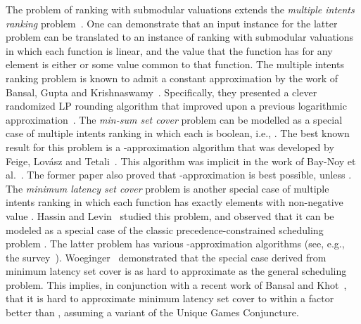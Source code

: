 \documentclass[11pt]{article}
\theoremstyle{plain}
\theoremstyle{definition}
\begin{document}
The problem of ranking with submodular valuations extends the
\emph{multiple intents ranking} problem~\cite{AzarGY09}. One can
demonstrate that an input instance for the latter problem can be
translated to an instance of ranking with submodular valuations in
which each function  is linear, and the value that the
function has for any element is either  or some value  common to that function. The multiple intents ranking
problem is known to admit a constant approximation by the work of
Bansal, Gupta and Krishnaswamy~\cite{BansalGK10}. Specifically,
they presented a clever randomized LP rounding algorithm that
improved upon a previous logarithmic
approximation~\cite{AzarGY09}. The \emph{min-sum set cover}
problem can be modelled as a special case of multiple intents
ranking in which each  is boolean, i.e., . The best known result for this problem is a
-approximation algorithm that was developed by Feige,
Lov{\'a}sz and Tetali~\cite{FeigeLT04}. This algorithm was
implicit in the work of Bay-Noy et al.~\cite{Bar-NoyBHST98}. The
former paper also proved that -approximation is best possible,
unless . The \emph{minimum latency set
cover} problem is another special case of multiple intents ranking
in which each function  has exactly 
elements with non-negative value . Hassin and
Levin~\cite{HassinL05} studied this problem, and observed that it
can be modeled as a special case of the classic
precedence-constrained scheduling problem .
The latter problem has various -approximation algorithms (see,
e.g., the survey~\cite{ChekuriK04}). Woeginger~\cite{Woeginger03}
demonstrated that the special case derived from minimum latency
set cover is as hard to approximate as the general scheduling
problem. This implies, in conjunction with a recent work of Bansal
and Khot~\cite{BansalK09}, that it is hard to approximate minimum
latency set cover to within a factor better than , assuming a
variant of the Unique Games Conjuncture.
\end{document}
